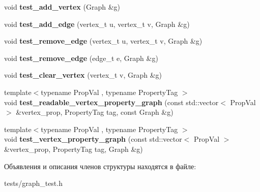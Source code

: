 \begin{DoxyCompactItemize}
\item 
\mbox{\label{structboost_1_1graph__test_a353001b6205a774e1c01538b948cab21}} 
void {\bfseries test\+\_\+add\+\_\+vertex} (Graph \&g)
\item 
\mbox{\label{structboost_1_1graph__test_ab1af5311dedf501d46ea89c702021410}} 
void {\bfseries test\+\_\+add\+\_\+edge} (vertex\+\_\+t u, vertex\+\_\+t v, Graph \&g)
\item 
\mbox{\label{structboost_1_1graph__test_ae769902ab95a2bd8a2665d30f97230c2}} 
void {\bfseries test\+\_\+remove\+\_\+edge} (vertex\+\_\+t u, vertex\+\_\+t v, Graph \&g)
\item 
\mbox{\label{structboost_1_1graph__test_a52655c001000960e476e7eebcce0fa74}} 
void {\bfseries test\+\_\+remove\+\_\+edge} (edge\+\_\+t e, Graph \&g)
\item 
\mbox{\label{structboost_1_1graph__test_aabd61820629d6c8355c840f37a006250}} 
void {\bfseries test\+\_\+clear\+\_\+vertex} (vertex\+\_\+t v, Graph \&g)
\item 
\mbox{\label{structboost_1_1graph__test_a799ea10186b6a78ee02b2d0ef903f0fd}} 
{\footnotesize template$<$typename Prop\+Val , typename Property\+Tag $>$ }\\void {\bfseries test\+\_\+readable\+\_\+vertex\+\_\+property\+\_\+graph} (const std\+::vector$<$ Prop\+Val $>$ \&vertex\+\_\+prop, Property\+Tag tag, const Graph \&g)
\item 
\mbox{\label{structboost_1_1graph__test_a77e36a1f163c6c8c73a62954503bb21c}} 
{\footnotesize template$<$typename Prop\+Val , typename Property\+Tag $>$ }\\void {\bfseries test\+\_\+vertex\+\_\+property\+\_\+graph} (const std\+::vector$<$ Prop\+Val $>$ \&vertex\+\_\+prop, Property\+Tag tag, Graph \&g)
\end{DoxyCompactItemize}


Объявления и описания членов структуры находятся в файле\+:\begin{DoxyCompactItemize}
\item 
tests/graph\+\_\+test.\+h\end{DoxyCompactItemize}
